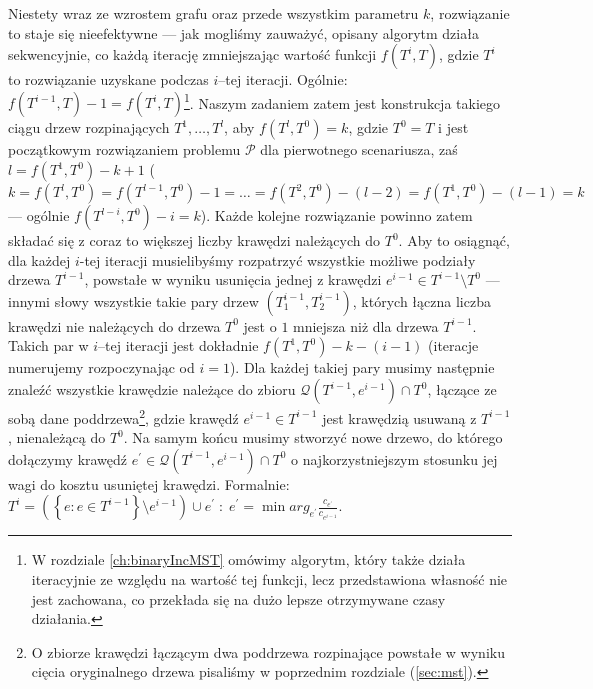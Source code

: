 Niestety wraz ze wzrostem grafu oraz przede wszystkim parametru $k$, rozwiązanie to staje się nieefektywne --- jak mogliśmy zauważyć, opisany algorytm działa sekwencyjnie, co każdą iterację zmniejszając wartość funkcji $f \left( T^{i}, T \right)$, gdzie $T^{i}$ to rozwiązanie uzyskane podczas $i$--tej iteracji. Ogólnie: $f \left( T^{i-1}, T \right) - 1 = f \left( T^{i}, T \right)$\footnote{W rozdziale \ref{ch:binaryIncMST} omówimy algorytm, który także działa iteracyjnie ze względu na wartość tej funkcji, lecz przedstawiona własność nie jest zachowana, co przekłada się na dużo lepsze otrzymywane czasy działania.}. Naszym zadaniem zatem jest konstrukcja takiego ciągu drzew rozpinających $T^{1}, \dots, T^{l}$, aby $f \left( T^{l}, T^{0} \right) = k$, gdzie $T^{0} = T$ i jest początkowym rozwiązaniem problemu $\mathcal{P}$ dla pierwotnego scenariusza, zaś $l = f \left( T^{1}, T^{0} \right) - k + 1$ ($k = f \left( T^{l}, T^{0} \right) = f \left( T^{l-1}, T^{0} \right) - 1 = \dots =  f \left( T^{2}, T^{0} \right) - \left( l - 2 \right) = f \left( T^{1}, T^{0} \right) - \left( l - 1 \right) = k$ --- ogólnie $f \left( T^{l - i}, T^{0} \right) - i = k$). Każde kolejne rozwiązanie powinno zatem składać się z coraz to większej liczby krawędzi należących do $T^{0}$. Aby to osiągnąć, dla każdej $i$-tej iteracji musielibyśmy rozpatrzyć wszystkie możliwe podziały drzewa $T^{i-1}$, powstałe w wyniku usunięcia jednej z krawędzi $e^{i-1} \in T^{i-1} \setminus T^{0}$ --- innymi słowy wszystkie takie pary drzew $\left( T^{i-1}_{1}, T^{i-1}_{2} \right)$, których łączna liczba krawędzi nie należących do drzewa $T^{0}$ jest o $1$ mniejsza niż dla drzewa $T^{i-1}$. Takich par w $i$--tej iteracji jest dokładnie $f \left( T^{1}, T^{0} \right) - k - \left( i - 1 \right)$ (iteracje numerujemy rozpoczynając od $i = 1$). Dla każdej takiej pary musimy następnie znaleźć wszystkie krawędzie należące do zbioru $\mathcal{Q} \left( T^{i-1}, e^{i-1} \right) \cap T^{0}$, łączące ze sobą dane poddrzewa\footnote{O zbiorze krawędzi łączącym dwa poddrzewa rozpinające powstałe w wyniku cięcia oryginalnego drzewa pisaliśmy w poprzednim rozdziale (\ref{sec:mst}).}, gdzie krawędź $e^{i-1} \in T^{i-1}$ jest krawędzią usuwaną z $T^{i-1}$, nienależącą do $T^{0}$. Na samym końcu musimy stworzyć nowe drzewo, do którego dołączymy krawędź $e^{\prime} \in \mathcal{Q} \left( T^{i-1}, e^{i-1} \right) \cap T^{0}$ o najkorzystniejszym stosunku jej wagi do kosztu usuniętej krawędzi. Formalnie: $T^{i} = \left( \left\{ e : e \in T^{i-1} \right\} \setminus e^{i-1} \right) \cup e^{\prime} \; : \; e^{\prime} = \min arg_{e^{\prime}} \frac{c_{e^{\prime}}}{c_{e^{i-1}}}$. 

